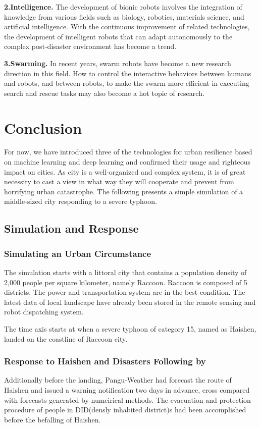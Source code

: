 \documentclass[conference]{IEEEtran}
\begin{document}
\textbf{2.Intelligence.} The development of bionic robots involves the integration of knowledge from various fields such as biology, robotics, materials science, and artificial intelligence. With the continuous improvement of related technologies, the development of intelligent robots that can adapt autonomously to the complex post-disaster environment has become a trend.

\textbf{3.Swarming.} In recent years, swarm robots have become a new research direction in this field. How to control the interactive behaviors between humans and robots, and between robots, to make the swarm more efficient in executing search and rescue tasks may also become a hot topic of research.

\section{\textbf{Conclusion}}
For now, we have introduced three of the technologies for urban resilience based on machine learning and deep learning and confirmed their usage and righteous impact on cities. As city is a well-organized and complex system\cite{b1}, it is of great necessity to cast a view in what way they will cooperate and prevent from horrifying urban catastrophe. The following presents a simple simulation of a middle-sized city responding to a severe typhoon.
\subsection{Simulation and Response}
\subsubsection{\textbf{Simulating an Urban Circumstance}}
The simulation starts with a littoral city that contains a population density of 2,000 people per square kilometer, namely Raccoon. Raccoon is composed of 5 districts. The power and transportation system are in the best condition. The latest data of local landscape have already been stored in the remote sensing and robot dispatching system.

The time axis starts at when a severe typhoon of category 15, named as Haishen, landed on the coastline of Raccoon city. 

\subsubsection{\textbf{Response to Haishen and Disasters Following by}}
Additionally before the landing, Pangu-Weather\cite{b15} had forecast the route of Haishen and issued a warning notification two days in advance, cross compared with forecasts generated by numeirical methods. The evacuation and protection procedure of people in DID(densly inhabited district)s had been accomplished before the befalling of Haishen.
\end{document}
